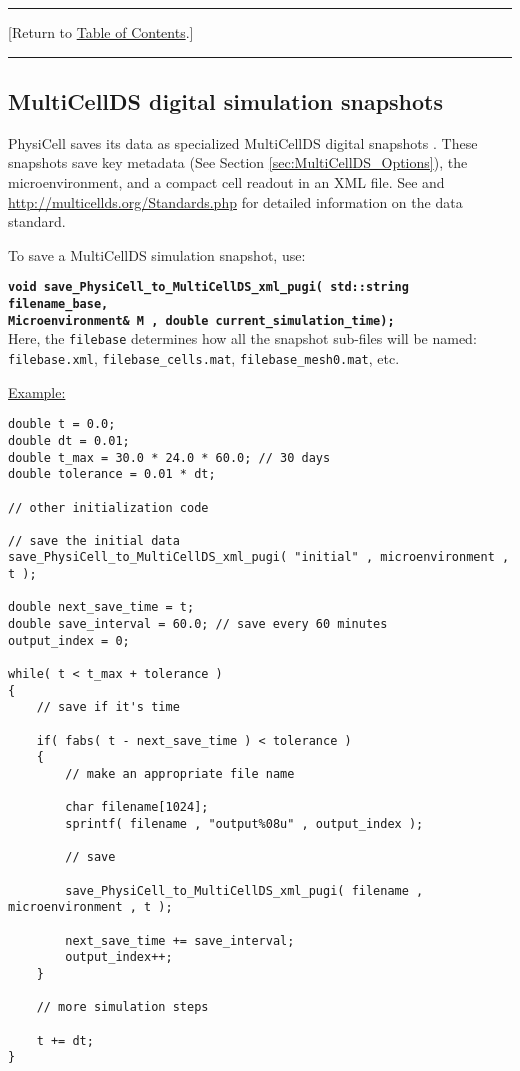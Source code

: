 \documentclass[12pt]{article}
\renewcommand{\v}{\verb}
\newcommand{\smallcode}[1]{\textbf{\texttt{#1}}}
\newcommand{\blue}[1]{\textcolor{blue}{#1}}
\newcommand{\DONE}{}%
\newcommand{\TOClink}{\begin{center}\hrule\vskip-10pt\phantom{.}\hfill[Return to \hyperlink{TOC}{Table of Contents}.]\hfill\phantom{.}\vskip3pt\hrule\end{center}}
\begin{document}
\TOClink

\subsection{MultiCellDS digital simulation snapshots \DONE}
PhysiCell saves its data as specialized MultiCellDS digital 
snapshots \cite{ref:MultiCellDS}. These snapshots save 
key metadata (See Section \ref{sec:MultiCellDS_Options}), 
the microenvironment, and a compact cell readout in an 
XML file. See \cite{ref:MultiCellDS} and 
\href{http://multicellds.org/Standards.php}{http://multicellds.org/Standards.php} 
for detailed information on the data standard. 

To save a MultiCellDS simulation snapshot, use: 

\smallcode{void save\_PhysiCell\_to\_MultiCellDS\_xml\_pugi( std::string filename\_base, \\
\phantom{void    }Microenvironment\& M , double current\_simulation\_time);} \\

Here, the \v|filebase| determines how all the snapshot sub-files will be named: 
\v|filebase.xml|, \v|filebase_cells.mat|, \v|filebase_mesh0.mat|, etc. 

\underline{Example:} 
\begin{verbatim}
double t = 0.0;
double dt = 0.01; 
double t_max = 30.0 * 24.0 * 60.0; // 30 days 
double tolerance = 0.01 * dt; 

// other initialization code 

// save the initial data 
save_PhysiCell_to_MultiCellDS_xml_pugi( "initial" , microenvironment , t ); 

double next_save_time = t; 
double save_interval = 60.0; // save every 60 minutes 
output_index = 0; 

while( t < t_max + tolerance )
{
    // save if it's time
    
    if( fabs( t - next_save_time ) < tolerance )
    {
        // make an appropriate file name 
    
        char filename[1024]; 
        sprintf( filename , "output%08u" , output_index ); 
        
        // save 

        save_PhysiCell_to_MultiCellDS_xml_pugi( filename , microenvironment , t ); 

        next_save_time += save_interval; 
        output_index++; 
    }

    // more simulation steps 

    t += dt; 
}
\end{verbatim}
\end{document}
